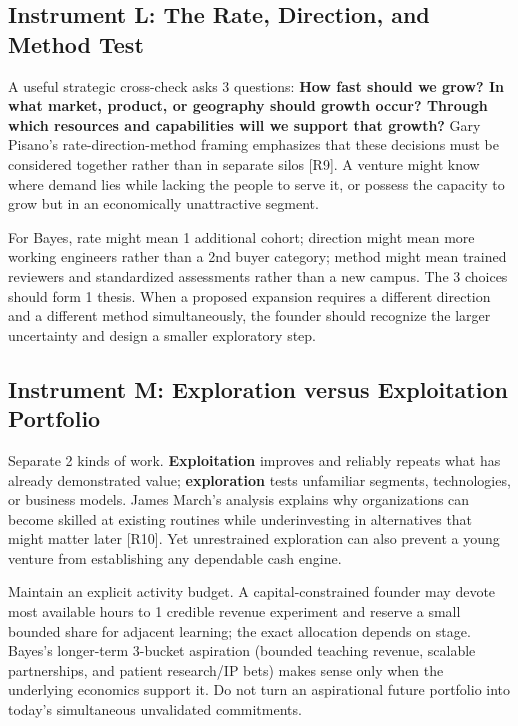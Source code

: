 \subsection{Instrument L: The Rate, Direction, and Method Test}
\label{sec:instrument_l_rate_direction_method}

A useful strategic cross-check asks 3 questions: \textbf{How fast should we grow? In what market, product, or geography should growth occur? Through which resources and capabilities will we support that growth?} Gary Pisano's rate-direction-method framing emphasizes that these decisions must be considered together rather than in separate silos [R9]. A venture might know where demand lies while lacking the people to serve it, or possess the capacity to grow but in an economically unattractive segment.

For Bayes, rate might mean 1 additional cohort; direction might mean more working engineers rather than a 2nd buyer category; method might mean trained reviewers and standardized assessments rather than a new campus. The 3 choices should form 1 thesis. When a proposed expansion requires a different direction and a different method simultaneously, the founder should recognize the larger uncertainty and design a smaller exploratory step.

\subsection{Instrument M: Exploration versus Exploitation Portfolio}
\label{sec:instrument_m_exploration_exploitation}

Separate 2 kinds of work. \textbf{Exploitation} improves and reliably repeats what has already demonstrated value; \textbf{exploration} tests unfamiliar segments, technologies, or business models. James March's analysis explains why organizations can become skilled at existing routines while underinvesting in alternatives that might matter later [R10]. Yet unrestrained exploration can also prevent a young venture from establishing any dependable cash engine.

Maintain an explicit activity budget. A capital-constrained founder may devote most available hours to 1 credible revenue experiment and reserve a small bounded share for adjacent learning; the exact allocation depends on stage. Bayes's longer-term 3-bucket aspiration (bounded teaching revenue, scalable partnerships, and patient research/IP bets) makes sense only when the underlying economics support it. Do not turn an aspirational future portfolio into today's simultaneous unvalidated commitments.

